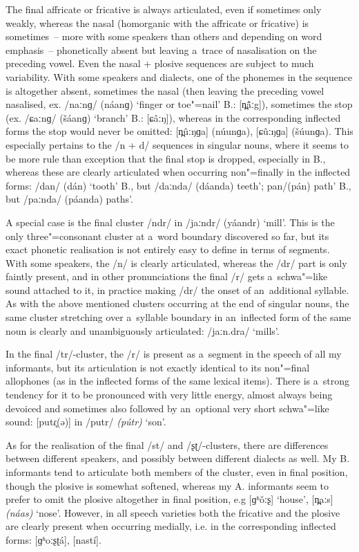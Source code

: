 The final affricate or fricative is always articulated, even if sometimes only weakly, whereas the
nasal (homorganic with the affricate or fricative) is sometimes~-- more with some speakers than
others and depending on word emphasis~-- phonetically absent but leaving a~trace of nasalisation on
the preceding vowel. Even the nasal + plosive sequences are subject to much variability. With some
speakers and dialects, one of the phonemes in the sequence is altogether absent, sometimes the nasal
(then leaving the preceding vowel nasalised, ex. /naːnɡ/
(náanɡ) `finger or toe"=nail' B.: [n̪\^{ã}ːg]), sometimes the stop (ex. /ɕaːnɡ/ (\v{s}áanɡ)
`branch' B.: [ɕâːŋ]), whereas in the corresponding inflected forms the stop would never be
omitted: [n̪ûːŋɡa] (núunɡa), [ɕûːŋɡa]
(\v{s}úunɡa). This especially pertains to the /n +
d/ sequences in singular nouns, where it seems to be more rule than exception that the final stop is
dropped, especially in B., whereas these are clearly articulated when occurring non"=finally in the
inflected forms: /dan/ (dán) `tooth' B., but
/daːnda/ (dáanda) teeth'; pan/(pán) path' B., but /paːnda/
(páanda) paths'.


A special case is the final cluster /ndr/ in /jaːndr/ (yáandr) `mill'. This is the only three"=consonant cluster at a~word boundary discovered so far, but its exact phonetic realisation is not entirely easy to define in terms of segments. With some speakers, the /n/ is clearly articulated, whereas the /dr/ part is only faintly present, and in other pronunciations the final /r/ gets a~schwa"=like sound attached to it, in practice making /dr/ the onset of an~additional syllable. As with the above mentioned clusters occurring at the end of singular nouns, the same cluster stretching over a~syllable boundary in an~inflected form of the same noun is clearly and unambiguously articulated: /jaːn.dra/ `mills'.


In the final /tr/-cluster, the /r/ is present as a~segment in the speech of all my informants, but its articulation is not exactly identical to its non"=final allophones (as in the inflected forms of the same lexical items). There is a~strong tendency for it to be pronounced with very little energy, almost always being devoiced and sometimes also followed by an~optional very short schwa"=like sound: [putɾ̥(ə)] in /putr/ \textit{(pútr)} `son'. 


As for the realisation of the final /st/ and /ʂʈ/-clusters, there are differences between different speakers, and possibly between different dialects as well. My B. informants tend to articulate both members of the cluster, even in final position, though the plosive is somewhat softened, whereas my A. informants seem to prefer to omit the plosive altogether in final position, e.g [ɡʱ\v{o}ːʂ] `house', [n̪aːs] \textit{(náas)} `nose'. However, in all speech varieties both the fricative and the plosive are clearly present when occurring medially, i.e. in the corresponding inflected forms: [ɡʱoːʂʈá], [nastí].


